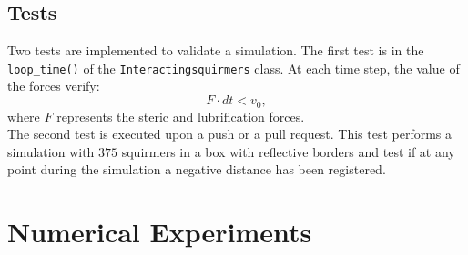 \documentclass{article}
\begin{document}
\subsection{Tests}
Two tests are implemented to validate a simulation. The first test is in the \texttt{loop\_time()} of the \texttt{Interactingsquirmers} class.
At each time step, the value of the forces verify:
$$F\cdot dt < v_0,$$
where $F$ represents the steric and lubrification forces.\\
The second test is executed upon a push or a pull request. This test performs a simulation with $375$ squirmers in a box
with reflective borders and test if at any point during the simulation a negative distance has been registered.

\newpage
\section{Numerical Experiments}
\end{document}
